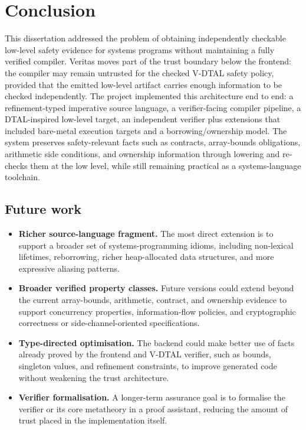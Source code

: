 
\chapter{Conclusion}\label{ch:conclusion}

This dissertation addressed the problem of obtaining independently checkable low-level safety evidence for systems programs without maintaining a fully verified compiler. Veritas moves part of the trust boundary below the frontend: the compiler may remain untrusted for the checked V-DTAL safety policy, provided that the emitted low-level artifact carries enough information to be checked independently. The project implemented this architecture end to end: a refinement-typed imperative source language, a verifier-facing compiler pipeline, a DTAL-inspired low-level target, an independent verifier plus extensions that included bare-metal execution targets and a borrowing/ownership model. The system preserves safety-relevant facts such as contracts, array-bounds obligations, arithmetic side conditions, and ownership information through lowering and re-checks them at the low level, while still remaining practical as a systems-language toolchain.

\section{Future work}

\begin{itemize}
  \item \textbf{Richer source-language fragment.} The most direct extension is to support a broader set of systems-programming idioms, including non-lexical lifetimes, reborrowing, richer heap-allocated data structures, and more expressive aliasing patterns.
  \item \textbf{Broader verified property classes.} Future versions could extend beyond the current array-bounds, arithmetic, contract, and ownership evidence to support concurrency properties, information-flow policies, and cryptographic correctness or side-channel-oriented specifications.
  \item \textbf{Type-directed optimisation.} The backend could make better use of facts already proved by the frontend and V-DTAL verifier, such as bounds, singleton values, and refinement constraints, to improve generated code without weakening the trust architecture.
  \item \textbf{Verifier formalisation.} A longer-term assurance goal is to formalise the verifier or its core metatheory in a proof assistant, reducing the amount of trust placed in the implementation itself.
\end{itemize}

